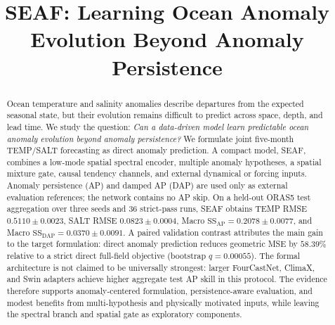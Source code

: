 \documentclass[conference]{IEEEtran}
\begin{document}
\raggedbottom

\title{SEAF: Learning Ocean Anomaly Evolution Beyond Anomaly Persistence}

\author{
}

\maketitle

\begin{abstract}
Ocean temperature and salinity anomalies describe departures from the expected seasonal state, but their evolution remains difficult to predict across space, depth, and lead time. We study the question: \emph{Can a data-driven model learn predictable ocean anomaly evolution beyond anomaly persistence?} We formulate joint five-month TEMP/SALT forecasting as direct anomaly prediction. A compact model, SEAF, combines a low-mode spatial spectral encoder, multiple anomaly hypotheses, a spatial mixture gate, causal tendency channels, and external dynamical or forcing inputs. Anomaly persistence (AP) and damped AP (DAP) are used only as external evaluation references; the network contains no AP skip. On a held-out ORAS5 test aggregation over three seeds and 36 strict-pass runs, SEAF obtains TEMP RMSE $0.5110\pm0.0023$, SALT RMSE $0.0823\pm0.0004$, Macro $\mathrm{SS}_{\mathrm{AP}}=0.2078\pm0.0077$, and Macro $\mathrm{SS}_{\mathrm{DAP}}=0.0370\pm0.0091$. A paired validation contrast attributes the main gain to the target formulation: direct anomaly prediction reduces geometric MSE by $58.39\%$ relative to a strict direct full-field objective (bootstrap $q=0.00055$). The formal architecture is not claimed to be universally strongest: larger FourCastNet, ClimaX, and Swin adapters achieve higher aggregate test AP skill in this protocol. The evidence therefore supports anomaly-centered formulation, persistence-aware evaluation, and modest benefits from multi-hypothesis and physically motivated inputs, while leaving the spectral branch and spatial gate as exploratory components.
\end{abstract}
\end{document}
